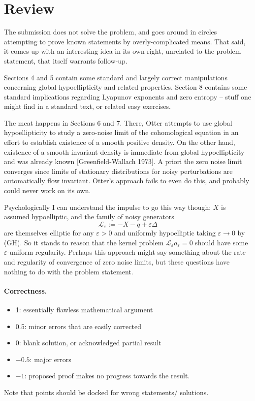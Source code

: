 \documentclass[11pt]{article}
\theoremstyle{definition}
\theoremstyle{remark}
\begin{document}
\maketitle

\section{Review}
{\color{gray} 

The submission does not solve the problem, and goes around in circles attempting to prove known statements by overly-complicated means. That said, it comes up with an interesting idea in its own right, unrelated to the problem statement, that itself warrants follow-up. 

Sections 4 and 5 contain some standard and largely correct manipulations concerning global hypoellipticity and related properties. Section 8 contains some standard implications regarding Lyapunov exponents and zero entropy -- stuff one might find in a standard text, or related easy exercises. 

The meat happens in Sections 6 and 7. There, Otter attempts to use global hypoellipticity to study a zero-noise limit of the cohomological equation in an effort to establish existence of a smooth positive density. On the other hand, existence of a smooth invariant density is immediate from global hypoellipticity and was already known [Greenfield-Wallach 1973]. A priori the zero noise limit converges since limits of stationary distributions for noisy perturbations are automatically flow invariant. Otter's approach fails to even do this, and probably could never work on its own.

Psychologically I can understand the impulse to go this way though: $X$ is assumed hypoelliptic, and the family of noisy generators 
\[\mathcal{L}_\varepsilon := -X  - q + \varepsilon \Delta\]
are themselves elliptic for any $\varepsilon > 0$ and uniformly hypoelliptic taking $\varepsilon \to 0$ by (GH). So it stands to reason that the kernel problem $\mathcal{L}_\varepsilon a_\varepsilon =0$ should have some $\varepsilon$-uniform regularity. 
Perhaps this approach might say something about the rate and regularity of convergence of zero noise limits, but these questions have nothing to do with the problem statement. 


}

\paragraph{Correctness.}
\begin{itemize}
	\item  1: essentially flawless mathematical argument
	\item  0.5: minor errors that are easily corrected
	\item  0: blank solution, or acknowledged partial result
	\item  $-0.5$: major errors
	\item  $-1$: proposed proof makes no progress towards the result.
\end{itemize}
Note that points should be docked for wrong statements/ solutions.
\end{document}

